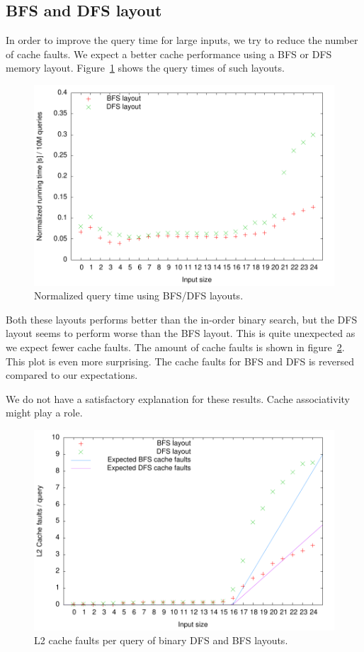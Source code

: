 \subsection{BFS and DFS layout}
In order to improve the query time for large inputs, we try to
reduce the number of cache faults. We expect a better cache
performance using a BFS or DFS memory
layout. Figure~\ref{fig:bfs_dfs_runningtime} shows the query times of
such layouts.
\begin{figure}[h!]
  \centering
  \includegraphics[width=\textwidth]{../week1/plots/outputs/bfs_dfs_runningtime}
  \caption{Normalized query time using BFS/DFS layouts.}
  \label{fig:bfs_dfs_runningtime}
\end{figure}
Both these layouts performs better than the in-order binary search,
but the DFS layout seems to perform worse than the BFS layout. This is quite unexpected as we expect fewer cache faults. The amount of cache faults is shown in figure~\ref{fig:bfs_dfs_cachefaults}. This plot is even more surprising. The cache faults for BFS and DFS is reversed compared to our expectations.

We do not have a satisfactory explanation for these results. Cache associativity might play a role.


\begin{figure}[h!]
  \centering
  \includegraphics[width=\textwidth]{../week1/plots/outputs/bfs_dfs_cachefaults}
  \caption{L2 cache faults per query of binary DFS and BFS layouts.}
    \label{fig:bfs_dfs_cachefaults}
\end{figure}

